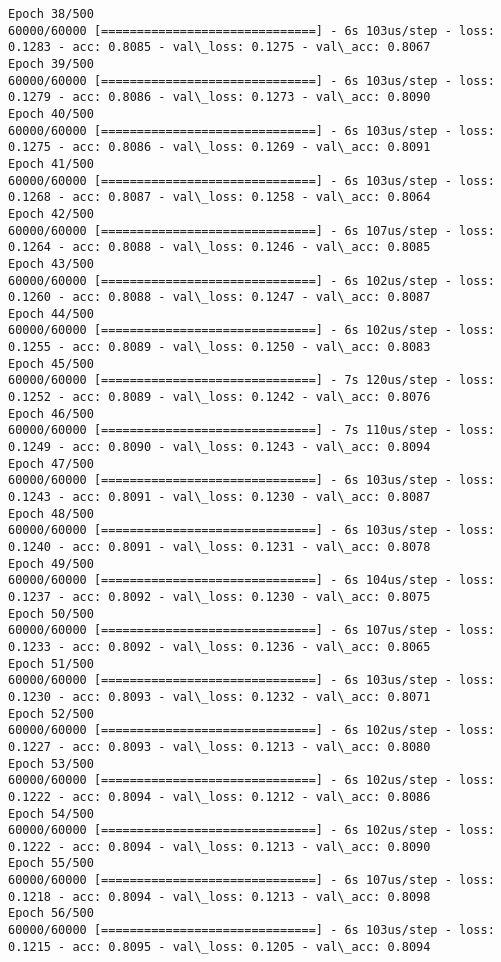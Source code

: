 \documentclass[11pt]{article}
\begin{document}
\begin{Verbatim}[commandchars=\\\{\}]
Epoch 38/500
60000/60000 [==============================] - 6s 103us/step - loss: 0.1283 - acc: 0.8085 - val\_loss: 0.1275 - val\_acc: 0.8067
Epoch 39/500
60000/60000 [==============================] - 6s 103us/step - loss: 0.1279 - acc: 0.8086 - val\_loss: 0.1273 - val\_acc: 0.8090
Epoch 40/500
60000/60000 [==============================] - 6s 103us/step - loss: 0.1275 - acc: 0.8086 - val\_loss: 0.1269 - val\_acc: 0.8091
Epoch 41/500
60000/60000 [==============================] - 6s 103us/step - loss: 0.1268 - acc: 0.8087 - val\_loss: 0.1258 - val\_acc: 0.8064
Epoch 42/500
60000/60000 [==============================] - 6s 107us/step - loss: 0.1264 - acc: 0.8088 - val\_loss: 0.1246 - val\_acc: 0.8085
Epoch 43/500
60000/60000 [==============================] - 6s 102us/step - loss: 0.1260 - acc: 0.8088 - val\_loss: 0.1247 - val\_acc: 0.8087
Epoch 44/500
60000/60000 [==============================] - 6s 102us/step - loss: 0.1255 - acc: 0.8089 - val\_loss: 0.1250 - val\_acc: 0.8083
Epoch 45/500
60000/60000 [==============================] - 7s 120us/step - loss: 0.1252 - acc: 0.8089 - val\_loss: 0.1242 - val\_acc: 0.8076
Epoch 46/500
60000/60000 [==============================] - 7s 110us/step - loss: 0.1249 - acc: 0.8090 - val\_loss: 0.1243 - val\_acc: 0.8094
Epoch 47/500
60000/60000 [==============================] - 6s 103us/step - loss: 0.1243 - acc: 0.8091 - val\_loss: 0.1230 - val\_acc: 0.8087
Epoch 48/500
60000/60000 [==============================] - 6s 103us/step - loss: 0.1240 - acc: 0.8091 - val\_loss: 0.1231 - val\_acc: 0.8078
Epoch 49/500
60000/60000 [==============================] - 6s 104us/step - loss: 0.1237 - acc: 0.8092 - val\_loss: 0.1230 - val\_acc: 0.8075
Epoch 50/500
60000/60000 [==============================] - 6s 107us/step - loss: 0.1233 - acc: 0.8092 - val\_loss: 0.1236 - val\_acc: 0.8065
Epoch 51/500
60000/60000 [==============================] - 6s 103us/step - loss: 0.1230 - acc: 0.8093 - val\_loss: 0.1232 - val\_acc: 0.8071
Epoch 52/500
60000/60000 [==============================] - 6s 102us/step - loss: 0.1227 - acc: 0.8093 - val\_loss: 0.1213 - val\_acc: 0.8080
Epoch 53/500
60000/60000 [==============================] - 6s 102us/step - loss: 0.1222 - acc: 0.8094 - val\_loss: 0.1212 - val\_acc: 0.8086
Epoch 54/500
60000/60000 [==============================] - 6s 102us/step - loss: 0.1222 - acc: 0.8094 - val\_loss: 0.1213 - val\_acc: 0.8090
Epoch 55/500
60000/60000 [==============================] - 6s 107us/step - loss: 0.1218 - acc: 0.8094 - val\_loss: 0.1213 - val\_acc: 0.8098
Epoch 56/500
60000/60000 [==============================] - 6s 103us/step - loss: 0.1215 - acc: 0.8095 - val\_loss: 0.1205 - val\_acc: 0.8094

\end{Verbatim}
\end{document}
